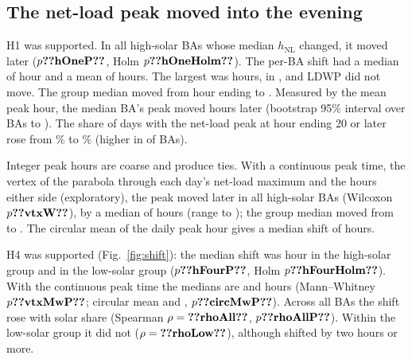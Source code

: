 \documentclass[conference,a4paper]{IEEEtran}
\begin{document}
\subsection{The net-load peak moved into the evening}\label{sec:shift}
H1 was supported. In all  high-solar BAs whose median $h_{\mathrm{NL}}$ changed, it moved later ($p\res{hOneP}$, Holm $p\res{hOneHolm}$). The per-BA shift had a median of  hour and a mean of  hours. The largest was  hours, in , and LDWP did not move. The group median moved from hour ending  to . Measured by the mean peak hour, the median BA's peak moved  hours later (bootstrap 95\% interval over BAs  to ). The share of days with the net-load peak at hour ending 20 or later rose from \% to \% (higher in  of  BAs).

Integer peak hours are coarse and produce ties. With a continuous peak time, the vertex of the parabola through each day's net-load maximum and the hours either side (exploratory), the peak moved later in all  high-solar BAs (Wilcoxon $p\res{vtxW}$), by a median of  hours (range  to ); the group median moved from  to . The circular mean of the daily peak hour gives a median shift of  hours.

H4 was supported (Fig.~\ref{fig:shift}): the median shift was  hour in the high-solar group and  in the low-solar group ($p\res{hFourP}$, Holm $p\res{hFourHolm}$). With the continuous peak time the medians are  and  hours (Mann--Whitney $p\res{vtxMwP}$; circular mean  and , $p\res{circMwP}$). Across all  BAs the shift rose with solar share (Spearman $\rho=\res{rhoAll}$, $p\res{rhoAllP}$). Within the low-solar group it did not ($\rho=\res{rhoLow}$), although  shifted by two hours or more.
\end{document}
